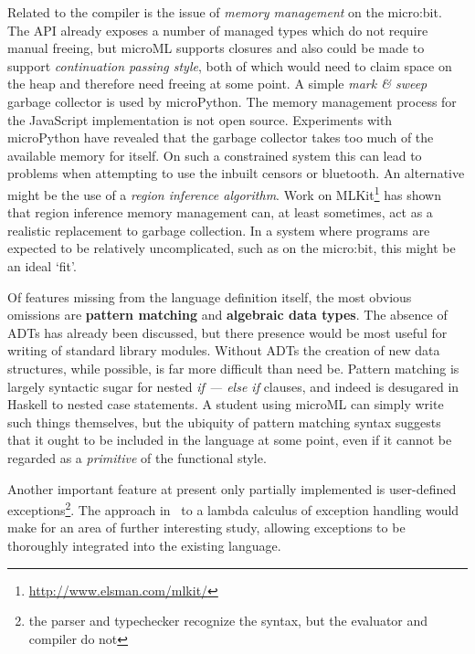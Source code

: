 \documentclass[12pt, a4paper]{report}
\begin{document}
Related to the compiler is the issue of \textit{memory management} on the micro:bit. The API already
exposes a number of managed types which do not require manual freeing, but microML supports closures
and also could be made to support \textit{continuation passing style}, both of which would need to
claim space on the heap and therefore need freeing at some point. A simple \textit{mark \& sweep}
garbage collector is used by microPython. The memory management process for the JavaScript
implementation is not open source. Experiments with microPython have revealed that the garbage
collector takes too much of the available memory for itself. On such a constrained system this can
lead to problems when attempting to use the inbuilt censors or bluetooth. An alternative might be
the use of a \textit{region inference algorithm}\cite{Tofte:1998:RIA:291891.291894}. Work on
MLKit\footnote{\url{http://www.elsman.com/mlkit/}} has shown that region inference memory management
can, at least sometimes, act as a realistic replacement to garbage collection. In a system where
programs are expected to be relatively uncomplicated, such as on the micro:bit, this might be an
ideal `fit'.

Of features missing from the language definition itself, the most obvious omissions are
\textbf{pattern matching} and \textbf{algebraic data types}. The absence of ADTs has already been
discussed, but there presence would be most useful for writing of standard library modules. Without
ADTs the creation of new data structures, while possible, is far more difficult than need be.
Pattern matching is largely syntactic sugar for nested \textit{if --- else if} clauses, and indeed
is desugared in Haskell to nested case statements. A student using microML can simply write such
things themselves, but the ubiquity of pattern matching syntax suggests that it ought to be included
in the language at some point, even if it cannot be regarded as a \textit{primitive} of the
functional style. 

Another important feature at present only partially implemented is user-defined
exceptions\footnote{the parser and typechecker recognize the syntax, but the evaluator and compiler
do not}. The approach in~\cite{deGroote1995} to a lambda calculus of exception handling would make
for an area of further interesting study, allowing exceptions to be thoroughly integrated into the
existing language.
\end{document}
